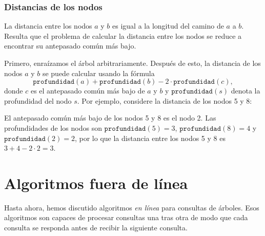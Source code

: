 \subsubsection{Distancias de los nodos}

La distancia entre los nodos $a$ y $b$
es igual a la longitud del camino de $a$ a $b$.
Resulta que el problema de calcular
la distancia entre los nodos se reduce a
encontrar su antepasado común más bajo.

Primero, enraízamos el árbol arbitrariamente.
Después de esto, la distancia de los nodos $a$ y $b$
se puede calcular usando la fórmula
\[\texttt{profundidad}(a)+\texttt{profundidad}(b)-2 \cdot \texttt{profundidad}(c),\]
donde $c$ es el antepasado común más bajo de $a$ y $b$
y $\texttt{profundidad}(s)$ denota la profundidad del nodo $s$.
Por ejemplo, considere la distancia de los nodos 5 y 8:
\begin{center}
\end{center}

El antepasado común más bajo de los nodos 5 y 8 es el nodo 2.
Las profundidades de los nodos son
$\texttt{profundidad}(5)=3$, $\texttt{profundidad}(8)=4$ y $\texttt{profundidad}(2)=2$,
por lo que la distancia entre los nodos 5 y 8 es
$3+4-2\cdot2=3$.

\section{Algoritmos fuera de línea}

Hasta ahora, hemos discutido algoritmos \emph{en línea}
para consultas de árboles.
Esos algoritmos son capaces de procesar
consultas una tras otra de modo que
cada consulta se responda antes de recibir la siguiente consulta.

